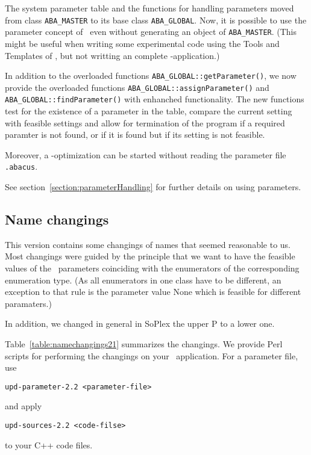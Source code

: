 The system parameter table and the functions for handling parameters
moved from class {\tt ABA\_MASTER} to its base class {\tt ABA\_GLOBAL}.
Now, it is possible to use the parameter concept of \ABACUS\ even without
generating an object of {\tt ABA\_MASTER}. (This might be useful when
writing some experimental code using the Tools and Templates of
\ABACUS, but not writting an complete \bac-application.)

In addition to the overloaded functions {\tt ABA\_GLOBAL::getParameter()},
 we now provide the overloaded functions {\tt ABA\_GLOBAL::assignParameter()}
and {\tt ABA\_GLOBAL::findParameter()} with enhanched functionality.
The
new functions test for the existence of a parameter in the
table, compare the current setting with feasible settings and allow
for termination of the program if a 
required paramter is not found, or if it is found but if its
setting is not feasible.

Moreover,  a \bac-optimization can be started without reading
the parameter file {\tt .abacus}.

See section~\ref{section:parameterHandling} for further details on
using parameters.
 

\subsection{Name changings}

This version contains some changings of names that seemed
reasonable to us. Most changings were guided by the principle
that we want to have the feasible values of the 
\ABACUS\ parameters coinciding with the 
enumerators of the corresponding enumeration type.
(As all enumerators in one class have to be different, an 
exception to that rule is the parameter value {\ttfamily None}
which is feasible for different paramaters.)

In addition, we changed in general in {\ttfamily SoPlex} the upper 
{\ttfamily P} to a lower one.

\smallskip

Table~\ref{table:namechangings21} summarizes the changings. We provide
Perl scripts for performing the changings on your \ABACUS\ application.
For a parameter file, use 
\begin{verbatim}
upd-parameter-2.2 <parameter-file>
\end{verbatim}
and apply
\begin{verbatim}
upd-sources-2.2 <code-filse>
\end{verbatim}
to your C++ code files.

